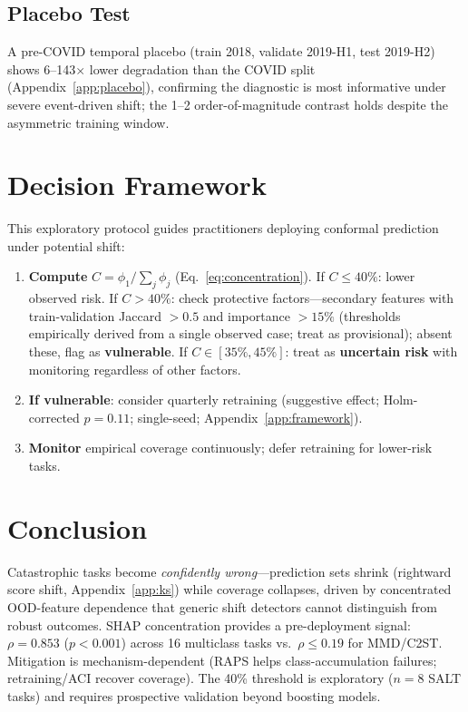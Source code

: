 \documentclass{uai2026} %
\begin{document}
\subsection{Placebo Test}

A pre-COVID temporal placebo (train 2018, validate 2019-H1, test 2019-H2) shows 6--143$\times$ lower degradation than the COVID split (Appendix~\ref{app:placebo}), confirming the diagnostic is most informative under severe event-driven shift; the 1--2 order-of-magnitude contrast holds despite the asymmetric training window.

\section{Decision Framework}\label{sec:framework}

This exploratory protocol guides practitioners deploying conformal prediction under potential shift:

\begin{enumerate}
    \item \textbf{Compute} $C = \phi_1 / \sum_j \phi_j$ (Eq.~\ref{eq:concentration}). If $C \leq 40\%$: lower observed risk. If $C > 40\%$: check protective factors---secondary features with train-validation Jaccard $> 0.5$ and importance $> 15\%$ (thresholds empirically derived from a single observed case; treat as provisional); absent these, flag as \textbf{vulnerable}. If $C \in [35\%, 45\%]$: treat as \textbf{uncertain risk} with monitoring regardless of other factors.
    \item \textbf{If vulnerable}: consider quarterly retraining (suggestive effect; Holm-corrected $p=0.11$; single-seed; Appendix~\ref{app:framework}).
    \item \textbf{Monitor} empirical coverage continuously; defer retraining for lower-risk tasks.
\end{enumerate}

\section{Conclusion}\label{sec:conclusion}

Catastrophic tasks become \textit{confidently wrong}---prediction sets shrink (rightward score shift, Appendix~\ref{app:ks}) while coverage collapses, driven by concentrated OOD-feature dependence that generic shift detectors cannot distinguish from robust outcomes. SHAP concentration provides a pre-deployment signal: $\rho=0.853$ ($p<0.001$) across 16 multiclass tasks vs.\ $\rho \leq 0.19$ for MMD/C2ST. Mitigation is mechanism-dependent (RAPS helps class-accumulation failures; retraining/ACI recover coverage). The 40\% threshold is exploratory ($n=8$ SALT tasks) and requires prospective validation beyond boosting models.
\end{document}

